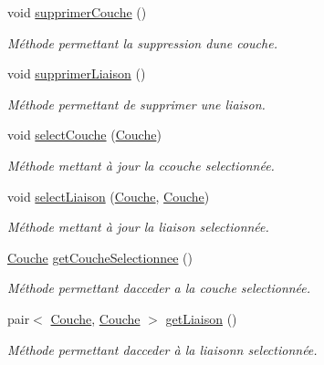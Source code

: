 \begin{DoxyCompactItemize}
void \hyperlink{class_panneau_architecture_a4b90aec081c2b2d0b2a3c3207183bd3f}{supprimer\+Couche} ()
\begin{DoxyCompactList}\small\item\em Méthode permettant la suppression d\textquotesingle{}une couche. \end{DoxyCompactList}\item 
\mbox{\label{class_panneau_architecture_af6e7d198ef558f75d8826cf9d52a1248}} 
void \hyperlink{class_panneau_architecture_af6e7d198ef558f75d8826cf9d52a1248}{supprimer\+Liaison} ()
\begin{DoxyCompactList}\small\item\em Méthode permettant de supprimer une liaison. \end{DoxyCompactList}\item 
\mbox{\label{class_panneau_architecture_a7670673acd7e9eb1e77e2cb5eb929079}} 
void \hyperlink{class_panneau_architecture_a7670673acd7e9eb1e77e2cb5eb929079}{select\+Couche} (\hyperlink{class_couche}{Couche})
\begin{DoxyCompactList}\small\item\em Méthode mettant à jour la ccouche selectionnée. \end{DoxyCompactList}\item 
\mbox{\label{class_panneau_architecture_a2e4ab85ad5fbc8801bf7ea3fab0ea197}} 
void \hyperlink{class_panneau_architecture_a2e4ab85ad5fbc8801bf7ea3fab0ea197}{select\+Liaison} (\hyperlink{class_couche}{Couche}, \hyperlink{class_couche}{Couche})
\begin{DoxyCompactList}\small\item\em Méthode mettant à jour la liaison selectionnée. \end{DoxyCompactList}\item 
\mbox{\label{class_panneau_architecture_a77c5b0be02105db0a55ec022cc319e4b}} 
\hyperlink{class_couche}{Couche} \hyperlink{class_panneau_architecture_a77c5b0be02105db0a55ec022cc319e4b}{get\+Couche\+Selectionnee} ()
\begin{DoxyCompactList}\small\item\em Méthode permettant d\textquotesingle{}acceder a la couche selectionnée. \end{DoxyCompactList}\item 
\mbox{\label{class_panneau_architecture_a8502f49ce3c223fa9cfe73b6621d5da8}} 
pair$<$ \hyperlink{class_couche}{Couche}, \hyperlink{class_couche}{Couche} $>$ \hyperlink{class_panneau_architecture_a8502f49ce3c223fa9cfe73b6621d5da8}{get\+Liaison} ()
\begin{DoxyCompactList}\small\item\em Méthode permettant d\textquotesingle{}acceder à la liaisonn selectionnée. \end{DoxyCompactList}\end{DoxyCompactItemize}


